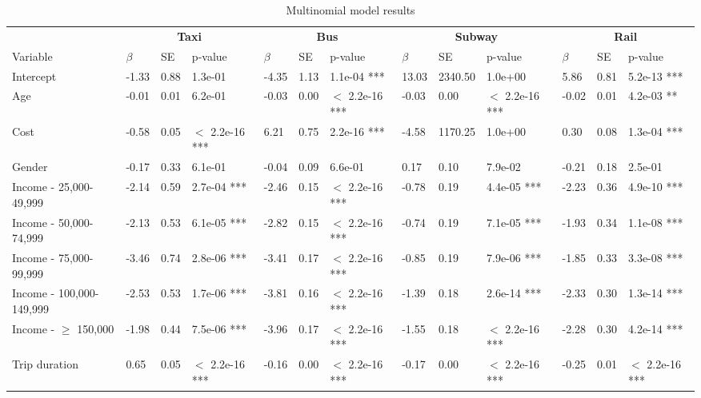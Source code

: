 \documentclass[numbered]{trbunofficial}\usepackage[]{graphicx}\usepackage[]{color}
\begin{document}
\begin{table}[!h]
	\centering
	\setlength{\tabcolsep}{2pt}
	\caption{Multinomial model results}
	\label{tab:fullmod}
\begingroup\fontsize{8}{10}\selectfont

\begin{tabular}{lllllllllllll}
\toprule
\multicolumn{1}{c}{\textbf{ }} & \multicolumn{3}{c}{\textbf{Taxi}} & \multicolumn{3}{c}{\textbf{Bus}} & \multicolumn{3}{c}{\textbf{Subway}} & \multicolumn{3}{c}{\textbf{Rail}} \\
\cmidrule(l{3pt}r{3pt}){2-4} \cmidrule(l{3pt}r{3pt}){5-7} \cmidrule(l{3pt}r{3pt}){8-10} \cmidrule(l{3pt}r{3pt}){11-13}
Variable & $\beta$ & SE & p-value & $\beta$ & SE & p-value & $\beta$ & SE & p-value & $\beta$ & SE & p-value\\
\midrule
Intercept & -1.33 & 0.88 & 1.3e-01 & -4.35 & 1.13 & 1.1e-04 *** & 13.03 & 2340.50 & 1.0e+00 & 5.86 & 0.81 & 5.2e-13 ***\\
Age & -0.01 & 0.01 & 6.2e-01 & -0.03 & 0.00 & $<$ 2.2e-16 *** & -0.03 & 0.00 & $<$ 2.2e-16 *** & -0.02 & 0.01 & 4.2e-03 **\\
Cost & -0.58 & 0.05 & $<$ 2.2e-16 *** & 6.21 & 0.75 & 2.2e-16 *** & -4.58 & 1170.25 & 1.0e+00 & 0.30 & 0.08 & 1.3e-04 ***\\
Gender & -0.17 & 0.33 & 6.1e-01 & -0.04 & 0.09 & 6.6e-01 & 0.17 & 0.10 & 7.9e-02 & -0.21 & 0.18 & 2.5e-01\\
Income - 25,000-49,999 & -2.14 & 0.59 & 2.7e-04 *** & -2.46 & 0.15 & $<$ 2.2e-16 *** & -0.78 & 0.19 & 4.4e-05 *** & -2.23 & 0.36 & 4.9e-10 ***\\
Income - 50,000-74,999 & -2.13 & 0.53 & 6.1e-05 *** & -2.82 & 0.15 & $<$ 2.2e-16 *** & -0.74 & 0.19 & 7.1e-05 *** & -1.93 & 0.34 & 1.1e-08 ***\\
Income - 75,000-99,999 & -3.46 & 0.74 & 2.8e-06 *** & -3.41 & 0.17 & $<$ 2.2e-16 *** & -0.85 & 0.19 & 7.9e-06 *** & -1.85 & 0.33 & 3.3e-08 ***\\
Income - 100,000-149,999 & -2.53 & 0.53 & 1.7e-06 *** & -3.81 & 0.16 & $<$ 2.2e-16 *** & -1.39 & 0.18 & 2.6e-14 *** & -2.33 & 0.30 & 1.3e-14 ***\\
Income - $\geq$ 150,000 & -1.98 & 0.44 & 7.5e-06 *** & -3.96 & 0.17 & $<$ 2.2e-16 *** & -1.55 & 0.18 & $<$ 2.2e-16 *** & -2.28 & 0.30 & 4.2e-14 ***\\
Trip duration & 0.65 & 0.05 & $<$ 2.2e-16 *** & -0.16 & 0.00 & $<$ 2.2e-16 *** & -0.17 & 0.00 & $<$ 2.2e-16 *** & -0.25 & 0.01 & $<$ 2.2e-16 ***\\

\end{tabular}
\end{table}
\end{document}
